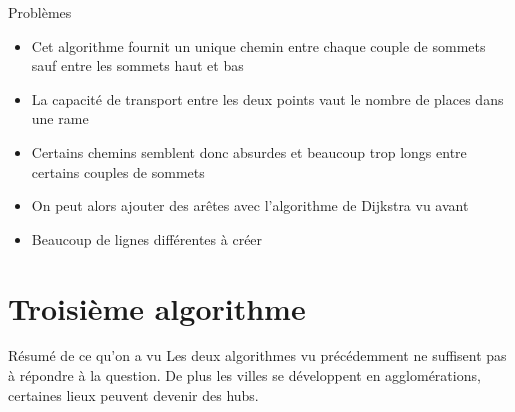 \documentclass[aspectratio=43,11pt]{beamer}
\begin{document}
\begin{frame}{Problèmes}
    \begin{itemize}
        \item Cet algorithme fournit un unique chemin entre chaque couple de sommets sauf entre les sommets haut et bas
        \item La capacité de transport entre les deux points vaut le nombre de places dans une rame
        \item Certains chemins semblent donc absurdes et beaucoup trop longs entre certains couples de sommets
        \item On peut alors ajouter des arêtes avec l'algorithme de Dijkstra vu avant
        \item Beaucoup de lignes différentes à créer
    \end{itemize}
\end{frame}

\section{Troisième algorithme}

\begin{frame}{Résumé de ce qu'on a vu}
    Les deux algorithmes vu précédemment ne suffisent pas à répondre à la question.
    De plus les villes se développent en agglomérations, certaines lieux peuvent devenir des hubs.
\end{frame}
\end{document}
